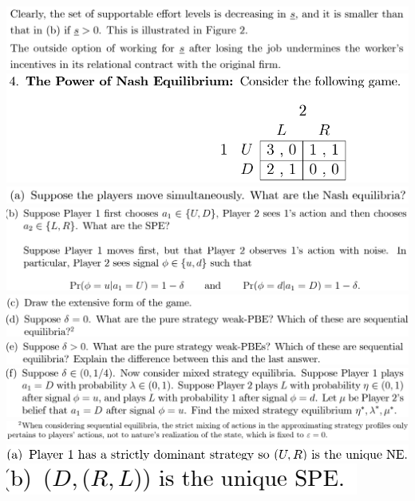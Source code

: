 \documentclass[8pt,landscape]{extarticle}
\begin{document}
\begin{multicols*}{3}
    \includegraphics[width=0.71\linewidth,keepaspectratio]{Screenshots/Screenshot 2024-03-11 133351.png}
    \includegraphics[width=0.65\linewidth,keepaspectratio]{Screenshots/Screenshot 2024-03-11 133401.png}
    \includegraphics[width=0.7\linewidth,keepaspectratio]{Screenshots/Screenshot 2024-03-11 133409.png}
    \includegraphics[width=0.81\linewidth,keepaspectratio]{Screenshots/Screenshot 2024-03-11 133414.png}
    \includegraphics[width=0.81\linewidth,keepaspectratio]{Screenshots/Screenshot 2024-03-11 133420.png}
    \includegraphics[width=0.82\linewidth,keepaspectratio]{Screenshots/Screenshot 2024-03-11 133424.png}
    \includegraphics[width=0.81\linewidth,keepaspectratio]{Screenshots/Screenshot 2024-03-11 133428.png}
    \includegraphics[width=0.87\linewidth,keepaspectratio]{Screenshots/Screenshot 2024-03-11 133432.png}
    \includegraphics[width=0.61\linewidth,keepaspectratio]{Screenshots/Screenshot 2024-03-11 133438.png}
    \includegraphics[width=0.29\linewidth,keepaspectratio]{Screenshots/Screenshot 2024-03-11 133443.png}

\end{multicols*}
\end{document}
